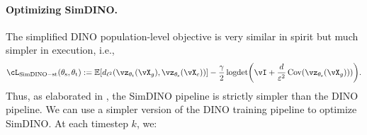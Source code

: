\documentclass[../../book-main.tex]{subfiles}
\begin{document}
\paragraph{Optimizing SimDINO.} The simplified DINO population-level objective is very similar in spirit but much simpler in execution, i.e.,
\begin{equation}\label{eq:simdino_loss_teacherstudent}
    \cL_{\simdino-\student\teacher}(\theta_{\student}, \theta_{\teacher}) :=  \Ex\rs{d_{\ell^{2}}(\vz_{\theta_{\teacher}}(\vX_{g}), \vz_{\theta_{\student}}(\vX_{c}))} - \frac{\gamma}{2}\logdet\rp{\vI + \frac{d}{\eps^{2}}\Cov(\vz_{\theta_{\student}}(\vX_{g})))}.
\end{equation}
Thus, as elaborated in , the SimDINO pipeline is strictly simpler than the DINO pipeline. We can use a simpler version of the DINO training pipeline to optimize SimDINO. At each timestep \(k\), we:
\end{document}
